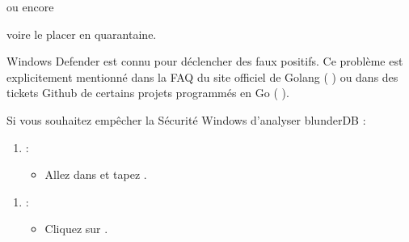 \documentclass[letterpaper,10pt,french]{sphinxmanual}
\begin{document}
\begin{figure}[htbp]
\centering

\noindent{}
\end{figure}

\sphinxAtStartPar
ou encore

\begin{figure}[htbp]
\centering

\noindent{}
\end{figure}

\sphinxAtStartPar
voire le placer en quarantaine.

\sphinxAtStartPar
Windows Defender est connu pour déclencher des faux positifs. Ce problème est
explicitement mentionné dans la FAQ du site officiel de Golang (
 ) ou dans des tickets Github de certains projets
programmés en Go (  ).

\sphinxAtStartPar
Si vous souhaitez empêcher la Sécurité Windows d’analyser blunderDB :
\begin{enumerate}
%
\item {} 
\sphinxAtStartPar
{} :
\begin{itemize}
\item {} 
\sphinxAtStartPar
Allez dans  et tapez .

\end{itemize}

\end{enumerate}

\begin{figure}[htbp]
\centering

\noindent{}
\end{figure}
\begin{enumerate}
%
\setcounter{enumi}{1}
\item {} 
\sphinxAtStartPar
{} :
\begin{itemize}
\item {} 
\sphinxAtStartPar
Cliquez sur .

\end{itemize}

\end{enumerate}
\end{document}
